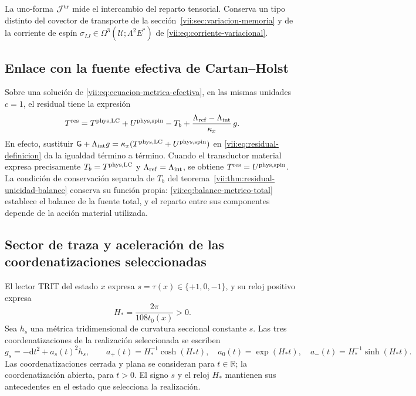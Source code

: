 La uno-forma \(\mathcal J^{\rm tr}\) mide el intercambio del reparto
tensorial. Conserva un tipo distinto del covector de transporte de la
sección~\ref{vii:sec:variacion-memoria} y de la corriente de espín
\(\sigma_{IJ}\in\Omega^3(\mathcal U;\Lambda^2E^*)\) de
\eqref{vii:eq:corriente-variacional}.

\subsection{Enlace con la fuente efectiva de Cartan--Holst}
\label{vii:subsec:residual-fuente-cartan}

Sobre una solución de \eqref{vii:eq:ecuacion-metrica-efectiva}, en las
mismas unidades \(c=1\), el residual tiene la expresión
\begin{equation}
 T^{\rm res}
 =T^{\rm phys,LC}+U^{\rm phys,spin}-T_b
   +\frac{\Lambda_{\rm ref}-\Lambda_{\rm int}}{\kappa_x}\,g.
 \label{vii:eq:residual-composicion-cartan}
\end{equation}
En efecto, sustituir
\(\mathsf G+\Lambda_{\rm int}g
  =\kappa_x(T^{\rm phys,LC}+U^{\rm phys,spin})\)
en \eqref{vii:eq:residual-definicion} da la igualdad término a término.
Cuando el transductor material expresa precisamente
\(T_b=T^{\rm phys,LC}\) y \(\Lambda_{\rm ref}=\Lambda_{\rm int}\),
se obtiene \(T^{\rm res}=U^{\rm phys,spin}\).
La condición de conservación separada de \(T_b\) del
teorema~\ref{vii:thm:residual-unicidad-balance} conserva su función
propia: \eqref{vii:eq:balance-metrico-total} establece el balance de la
fuente total, y el reparto entre sus componentes depende de la acción
material utilizada.

\subsection{Sector de traza y aceleración de las coordenatizaciones seleccionadas}
\label{vii:subsec:residual-aceleracion-ds}

El lector TRIT del estado \(x\) expresa \(s=\tau(x)\in\{+1,0,-1\}\),
y su reloj positivo expresa
\begin{equation}
 H_*=\frac{2\pi}{108t_0(x)}>0.
 \label{vii:eq:reloj-carta-ds}
\end{equation}
Sea \(h_s\) una métrica tridimensional de curvatura seccional constante
\(s\). Las tres coordenatizaciones de la realización seleccionada se escriben
\begin{equation}
 g_s=-\mathrm dt^2+a_s(t)^2h_s,\qquad
 a_+(t)=H_*^{-1}\cosh(H_*t),\quad
 a_0(t)=\exp(H_*t),\quad
 a_-(t)=H_*^{-1}\sinh(H_*t).
 \label{vii:eq:cartas-ds-residual}
\end{equation}
Las coordenatizaciones cerrada y plana se consideran para \(t\in\mathbb R\);
la coordenatización abierta, para \(t>0\). El signo \(s\) y el reloj \(H_*\)
mantienen sus antecedentes en el estado que selecciona la realización.

